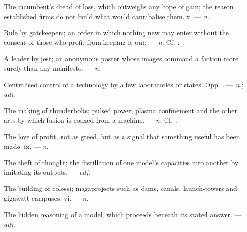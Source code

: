  The incumbent's dread of loss, which outweighs any hope of gain; the reason established firms do not build what would cannibalise them.   x. ---  \textit{n.}

 Rule by gatekeepers; an order in which nothing new may enter without the consent of those who profit from keeping it out. ---  \textit{n.} Cf. .

 A leader by jest; an anonymous poster whose images command a faction more surely than any manifesto.   ---  \textit{n.}

 Centralised control of a technology by a few laboratories or states. Opp. . ---  \textit{n.};  \textit{adj.}

 The making of thunderbolts; pulsed power, plasma confinement and the other arts by which fusion is coaxed from a machine. ---  \textit{n.} Cf. .

 The love of profit, not as greed, but as a signal that something useful has been made.   ix. ---  \textit{n.}

 The theft of thought; the distillation of one model's capacities into another by imitating its outputs. ---  \textit{adj.}

 The building of colossi; megaprojects such as dams, canals, launch-towers and gigawatt campuses.   vi. ---  \textit{n.}

 The hidden reasoning of a model, which proceeds beneath its stated answer. ---  \textit{adj.}

